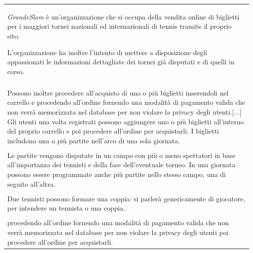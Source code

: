 \documentclass[10pt]{article}
\begin{document}
\begin{xtabular}{|p{\textwidth}|}
    \hline
      \\ 
    \hline
    \textit{GrandeSlam} è un'organizzazione che si occupa della vendita online di biglietti per i maggiori tornei nazionali ed internazionali di tennis tramite il proprio sito.
    
    L'organizzazione ha inoltre l'intento di mettere a disposizione degli appassionati le informazioni dettagliate dei tornei già disputati e di quelli in corso. \\
    \hline
      \\ 
    \hline
    Possono inoltre procedere all’acquisto di uno o più biglietti inserendoli nel carrello e procedendo all’ordine fornendo una modalità di pagamento valida che non verrà memorizzata nel database per non violare la privacy degli utenti.[...] Gli utenti una volta registrati possono aggiungere uno o più biglietti all’interno del proprio carrello e poi procedere all’ordine per acquistarli.\newline
    I biglietti includono una o più partite nell’arco di una sola giornata.\\
    \hline
      \\ 
    \hline
    Le partite vengono disputate in un campo con più o meno spettatori in base all'importanza dei tennisti e della fase dell'eventuale torneo.\newline
    In una giornata possono essere programmate anche più partite nello stesso campo, una di seguito all'altra. \\
    \hline
      \\ 
    \hline
    Due tennisti possono formare una coppia: si parlerà genericamente di giocatore, per intendere un tennista o una coppia. \\
    \hline
      \\ 
    \hline
    [...] procedendo all’ordine fornendo una modalità di pagamento valida che non verrà memorizzata nel database per non violare la privacy degli utenti \newline
    [...] poi procedere all'ordine per acquistarli. \\

\end{xtabular}
\end{document}
